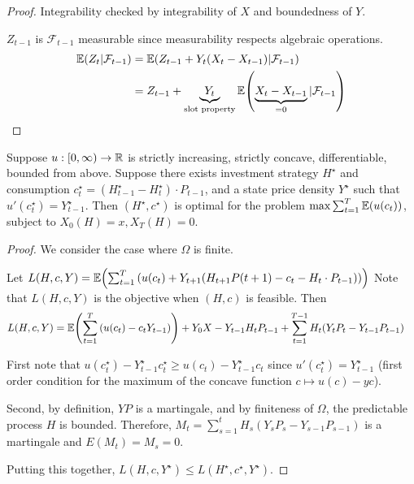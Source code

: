 \begin{proof}
  Integrability checked by integrability of $X$ and boundedness of
  $Y$.

  $Z_{t-1}$ is $\mathcal{F}_{t-1}$ measurable since measurability
  respects algebraic operations.
  \begin{align*}
    \E{Z_{t} | \mathcal{F}_{t-1}} & = \E{Z_{t-1} + Y_{t}(X_{t} -
      X_{t-1}) | \mathcal{F}_{t-1}} \\
                                  & = Z_{t-1} + \underbrace{Y_{t}}_{\text{slot property}} \E{\underbrace{X_{t} - X_{t-1}}_{=0} | \mathcal{F}_{t-1}}
  \end{align*}
\end{proof}

\begin{thm}
  \label{defn:discrete_time_models:9}
  Suppose $u: [0, \infty) \rightarrow \mathbb{R}$ is strictly increasing,
  strictly concave, differentiable, bounded from above.  Suppose there
  exists investment strategy $H^{\star}$ and consumption
  $c^{\star}_{t}= (H^{\star}_{t-1} - H^{\star}_{t}) \cdot P_{t-1}$,
  and a state price density $Y^{\star}$ such that $u'(c^{\star}_{t}) =
  Y^{\star}_{t-1}$.  Then $(H^{\star}, c^{\star})$ is optimal for the
  problem $\max \sum_{t=1}^{T} \E{u(c_{t})}$, subject to $X_{0}(H) =
  x, X_{T}(H) = 0$.
\end{thm}

\begin{proof}
  We consider the case where $\Omega$ is finite.

  Let $L(H, c, Y) = \E{\sum_{t=1}^{T} \left( u(c_{t}) +
      Y_{t+1}(H_{t+1} P(t+1)
      - c_{t} - H_{t} \cdot P_{t-1}) \right)}$
  Note that $L(H, c, Y)$ is the objective when $(H, c)$ is feasible.
  Then
  \begin{align*}
    L(H, c, Y) &= \E{\sum_{t=1}^{T} \left(u(c_{t}) - c_{t}
        Y_{t-1}\right)}
    +  Y_{0} X - Y_{t-1} H_{t} P_{t-1} + \sum_{t=1}^{T-1} H_{t}(Y_{t}
    P_{t} - Y_{t-1} P_{t-1})
  \end{align*}

  First note that $u(c^{\star}_{t}) - Y^{\star}_{t-1} c^{\star}_{t}
  \geq u(c_{t}) - Y^{\star}_{t-1} c_{t}$ since $u'(c^{\star}_{t}) =
  Y^{\star}_{t-1}$ (first order condition for the maximum of the
  concave function $c \mapsto u(c) - yc$).

  Second, by definition, $YP$ is a martingale, and by finiteness of
  $\Omega$, the predictable process $H$ is bounded. Therefore, $M_{t}
  = \sum_{s=1}^{t} H_{s}(Y_{s} P_{s} - Y_{s-1} P_{s-1})$ is a
  martingale and $E(M_{t}) = M_{s} = 0$.

  Putting this together, $L(H, c, Y^{\star}) \leq L(H^{\star},
  c^{\star}, Y^{\star})$.
\end{proof}

